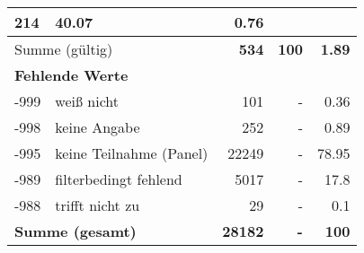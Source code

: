 \begin{longtable}{lXrrr}
       \num{214} &
       \num[round-mode=places,round-precision=2]{40.07} &
         \num[round-mode=places,round-precision=2]{0.76} \\
     \midrule
     \multicolumn{2}{l}{Summe (gültig)} &
       \textbf{\num{534}} &
     \textbf{100} &
       \textbf{\num[round-mode=places,round-precision=2]{1.89}} \\
     \multicolumn{5}{l}{\textbf{Fehlende Werte}}\\
       -999 &
       weiß nicht &
         \num{101} &
        - &
         \num[round-mode=places,round-precision=2]{0.36} \\
       -998 &
       keine Angabe &
         \num{252} &
        - &
         \num[round-mode=places,round-precision=2]{0.89} \\
       -995 &
       keine Teilnahme (Panel) &
         \num{22249} &
        - &
         \num[round-mode=places,round-precision=2]{78.95} \\
       -989 &
       filterbedingt fehlend &
         \num{5017} &
        - &
         \num[round-mode=places,round-precision=2]{17.8} \\
       -988 &
       trifft nicht zu &
         \num{29} &
        - &
         \num[round-mode=places,round-precision=2]{0.1} \\
     \midrule
     \multicolumn{2}{l}{\textbf{Summe (gesamt)}} &
          \textbf{\num{28182}} &
        \textbf{-} &
        \textbf{100} \\
     \bottomrule
     \end{longtable}
     
